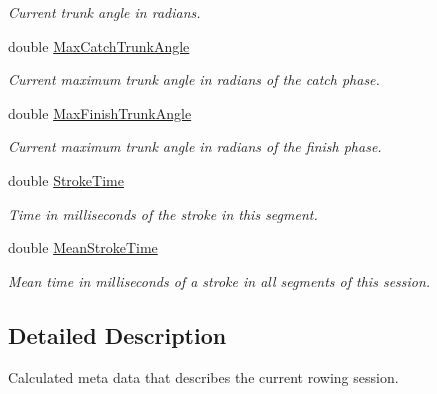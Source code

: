 \begin{DoxyCompactItemize}
\begin{DoxyCompactList}\small\item\em Current trunk angle in radians. \end{DoxyCompactList}\item 
double \hyperlink{struct_rowing_monitor_1_1_model_1_1_util_1_1_rowing_meta_data_a584871b9e8b5cd821f4d080acd9cd917}{Max\+Catch\+Trunk\+Angle}
\begin{DoxyCompactList}\small\item\em Current maximum trunk angle in radians of the catch phase. \end{DoxyCompactList}\item 
double \hyperlink{struct_rowing_monitor_1_1_model_1_1_util_1_1_rowing_meta_data_a754aef1dc0344af59d83e10debf08b8b}{Max\+Finish\+Trunk\+Angle}
\begin{DoxyCompactList}\small\item\em Current maximum trunk angle in radians of the finish phase. \end{DoxyCompactList}\item 
double \hyperlink{struct_rowing_monitor_1_1_model_1_1_util_1_1_rowing_meta_data_a0a6432675dcb22807c72965ee2576422}{Stroke\+Time}
\begin{DoxyCompactList}\small\item\em Time in milliseconds of the stroke in this segment. \end{DoxyCompactList}\item 
double \hyperlink{struct_rowing_monitor_1_1_model_1_1_util_1_1_rowing_meta_data_ae25c2935da8062e6decc9c8a0a02f423}{Mean\+Stroke\+Time}
\begin{DoxyCompactList}\small\item\em Mean time in milliseconds of a stroke in all segments of this session. \end{DoxyCompactList}\end{DoxyCompactItemize}


\subsection{Detailed Description}
Calculated meta data that describes the current rowing session. 



